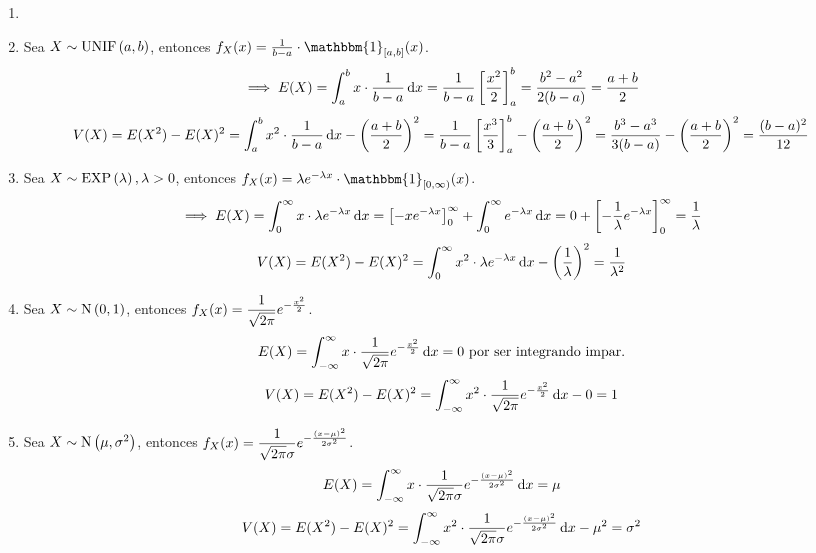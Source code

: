 \begin{ejem}
	\begin{enumerate}
		\item[]
		\item Sea $X\sim\operatorname{UNIF}\left(a,b\right)$, entonces $f_X(x)=\frac{1}{b-a}\cdot \mathbbm{1}_{[a,b]}(x)$.
		      \[\implies E(X) = \int_{a}^{b} x \cdot \frac{1}{b-a} \odif{x} = \frac{1}{b-a} \left[\frac{x^2}{2}\right]_{a}^{b} = \frac{b^2-a^2}{2(b-a)} = \frac{a+b}{2}\]
		      \[V(X) = E(X^2) - E(X)^2 = \int_{a}^{b} x^2 \cdot \frac{1}{b-a} \odif{x} - \left(\frac{a+b}{2}\right)^2 = \frac{1}{b-a} \left[\frac{x^3}{3}\right]_{a}^{b} - \left(\frac{a+b}{2}\right)^2 = \frac{b^3-a^3}{3(b-a)} - \left(\frac{a+b}{2}\right)^2 = \frac{(b-a)^2}{12}\]
		\item Sea $X\sim\operatorname{EXP}\left(\lambda\right), \lambda > 0$, entonces $f_X(x)=\lambda e^{-\lambda x} \cdot \mathbbm{1}_{[0,\infty)}(x)$.
		      \[\implies E(X)= \int_{0}^{\infty} x \cdot \lambda e^{-\lambda x} \odif{x} = \left[-x e^{-\lambda x}\right]_{0}^{\infty} + \int_{0}^{\infty} e^{-\lambda x} \odif{x} = 0 + \left[-\frac{1}{\lambda} e^{-\lambda x}\right]_{0}^{\infty} = \frac{1}{\lambda}\]
		      \[V(X) = E(X^2) - E(X)^2 = \int_{0}^{\infty} x^2 \cdot \lambda e^{-\lambda x} \odif{x} - \left(\frac{1}{\lambda}\right)^2 = \frac{1}{\lambda^2}\]
		\item Sea $X\sim\operatorname{N}\left(0, 1\right)$, entonces $\displaystyle f_X(x)=\frac{1}{\sqrt{2\pi}} e^{-\frac{x^2}{2}}$.
		      \[E(X) = \int_{-\infty}^{\infty} x \cdot \frac{1}{\sqrt{2\pi}} e^{-\frac{x^2}{2}} \odif{x} = 0 \tex{ por ser integrando impar.}\]
		      \[V(X) = E(X^2) - E(X)^2 = \int_{-\infty}^{\infty} x^2 \cdot \frac{1}{\sqrt{2\pi}} e^{-\frac{x^2}{2}} \odif{x} - 0 = 1\] %
		\item Sea $X\sim\operatorname{N}\left(\mu, \sigma^2\right)$, entonces $\displaystyle f_X(x)=\frac{1}{\sqrt{2\pi}\sigma} e^{-\frac{(x-\mu)^2}{2\sigma^2}}$.
		      \[E(X) = \int_{-\infty}^{\infty} x \cdot \frac{1}{\sqrt{2\pi}\sigma} e^{-\frac{(x-\mu)^2}{2\sigma^2}} \odif{x} = \mu\]
		      \[V(X) = E(X^2) - E(X)^2 = \int_{-\infty}^{\infty} x^2 \cdot \frac{1}{\sqrt{2\pi}\sigma} e^{-\frac{(x-\mu)^2}{2\sigma^2}} \odif{x} - \mu^2 = \sigma^2\] %
	\end{enumerate}
\end{ejem}
